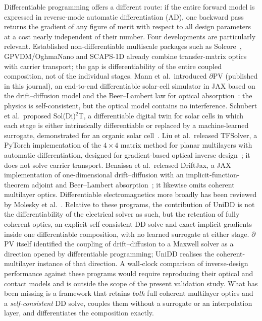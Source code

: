 \documentclass[preprint,12pt]{elsarticle}
\begin{document}
Differentiable programming offers a different route: if the entire forward
model is expressed in reverse-mode automatic differentiation (AD), one
backward pass returns the gradient of any figure of merit with respect to all
design parameters at a cost nearly independent of their number. Four
developments are particularly relevant. Established non-differentiable
multiscale packages such as Solcore~\cite{solcore2018}, GPVDM/OghmaNano
and SCAPS-1D already combine transfer-matrix optics with carrier
transport; the gap is differentiability of the entire coupled
composition, not of the individual stages. Mann et al.\ introduced
$\partial$PV (published in this journal), an end-to-end differentiable solar-cell simulator in JAX based
on the drift--diffusion model and the Beer--Lambert law for optical
absorption~\cite{mann2022}: the physics is self-consistent, but the optical
model contains no interference. Schubert et al.\ proposed Sol(Di)$^2$T, a
differentiable digital twin for solar cells in which each stage is either
intrinsically differentiable or replaced by a machine-learned surrogate,
demonstrated for an organic solar cell~\cite{schubert2025}. Liu et al.\
released TFSolver, a PyTorch implementation of the $4\times4$ matrix method
for planar multilayers with automatic differentiation, designed for
gradient-based optical inverse design~\cite{liu2025}; it does not solve
carrier transport. Benaissa et al.\ released DriftJax, a JAX implementation of one-dimensional drift--diffusion with an implicit-function-theorem adjoint and Beer--Lambert absorption~\cite{driftjax2026}; it likewise omits coherent multilayer optics. Differentiable electromagnetics more broadly has been
reviewed by Molesky et al.~\cite{molesky2018}. Relative to these programs, the contribution of UniDD is not the differentiability of the electrical solver as such, but the retention of fully coherent optics, an explicit self-consistent DD solve and exact implicit gradients inside one differentiable composition, with no learned surrogate at either stage. $\partial$PV itself identified the coupling of drift--diffusion to a Maxwell solver as a direction opened by differentiable programming; UniDD realises the coherent-multilayer instance of that direction. A wall-clock comparison of inverse-design performance against these programs would require reproducing their optical and contact models and is outside the scope of the present validation study. What has been missing is a
framework that retains \emph{both} full coherent multilayer optics and a
\emph{self-consistent} DD solve, couples them without a surrogate or an
interpolation layer, and differentiates the composition exactly.
\end{document}
